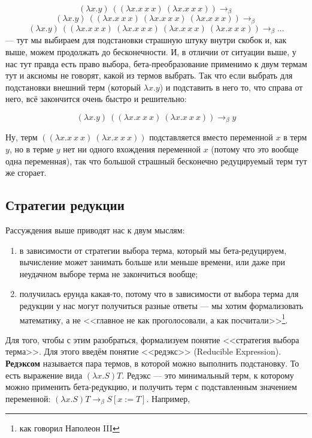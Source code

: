 \documentclass{../../text-style}
\begin{document}
$$(\lambda x.y)\ ((\lambda x.x\ x\ x)\ (\lambda x.x\ x\ x)) \rightarrow_\beta$$ 
$$(\lambda x.y)\ ((\lambda x.x\ x\ x)\ (\lambda x.x\ x\ x)\ (\lambda x.x\ x\ x)) \rightarrow_\beta$$
$$(\lambda x.y)\ ((\lambda x.x\ x\ x)\ (\lambda x.x\ x\ x)\ (\lambda x.x\ x\ x)\ (\lambda x.x\ x\ x)) \rightarrow_\beta ...$$
--- тут мы выбираем для подстановки страшную штуку внутри скобок и, как выше, можем продолжать до бесконечности. И, в отличии от ситуации выше, у нас тут правда есть право выбора, бета-преобразование применимо к двум термам тут и аксиомы не говорят, какой из термов выбрать. Так что если выбрать для подстановки внешний терм (который $\lambda x.y$) и подставить в него то, что справа от него, всё закончится очень быстро и решительно:

$$(\lambda x.y)\ ((\lambda x.x\ x\ x)\ (\lambda x.x\ x\ x)) \rightarrow_\beta y$$

Ну, терм $((\lambda x.x\ x\ x)\ (\lambda x.x\ x\ x))$ подставляется вместо переменной $x$ в терм $y$, но в терме $y$ нет ни одного вхождения переменной $x$ (потому что это вообще одна переменная), так что большой страшный бесконечно редуцируемый терм тут же сгорает.

\subsection{Стратегии редукции}

Рассуждения выше приводят нас к двум мыслям: 

\begin{enumerate}
    \item в зависимости от стратегии выбора терма, который мы бета-редуцируем, вычисление может занимать больше или меньше времени, или даже при неудачном выборе терма не закончиться вообще;
    \item получилась ерунда какая-то, потому что в зависимости от выбора терма для редукции у нас могут получиться разные ответы --- мы хотим формализовать математику, а не <<главное не как проголосовали, а как посчитали>>\footnote{как говорил Наполеон III}.
\end{enumerate}

Для того, чтобы с этим разобраться, формализуем понятие <<стратегия выбора терма>>. Для этого введём понятие <<редэкс>> (Reducible Expression). \textbf{Редэксом} называется пара термов, в которой можно выполнить подстановку. То есть выражение вида $(\lambda x.S) T$. Редэкс --- это минимальный терм, к которому можно применить бета-редукцию, и получить терм с подставленным значением переменной: $(\lambda x.S) T \rightarrow_\beta S[x := T]$. Например, 
\end{document}
